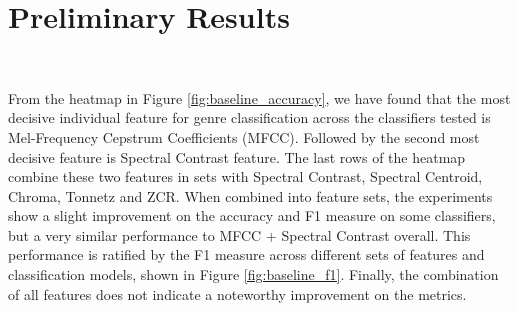 \section{Preliminary Results}

\begin{figure*}[ht]
    
    \caption{Models vs. Feature Sets and their accuracies on the validation set [0-100\%].}
    \label{fig:baseline_accuracy}
\end{figure*}

\par~

\begin{figure*}[ht]
    
    \caption{Models vs. Features Sets and their F1-measures on the validation set [0-100\%].}
    \label{fig:baseline_f1}
\end{figure*}




From the heatmap in Figure \ref{fig:baseline_accuracy}, we have found that the most decisive individual feature for genre classification across the classifiers tested is Mel-Frequency Cepstrum Coefficients (MFCC). Followed by the second most decisive feature is Spectral Contrast feature. The last rows of the heatmap combine these two features in sets with Spectral Contrast, Spectral Centroid, Chroma, Tonnetz and ZCR. When combined into feature sets, the experiments show a slight improvement on the accuracy and F1 measure on some classifiers, but a very similar performance to MFCC + Spectral Contrast overall. This performance is ratified by the F1 measure across different sets of features and classification models, shown in Figure \ref{fig:baseline_f1}. Finally, the combination of all features does not indicate a noteworthy improvement on the metrics.
